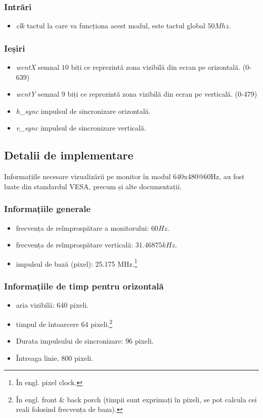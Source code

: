 \documentclass[12pt,twoside,a4paper,fleqn]{book}
\theoremstyle{definition}
\begin{document}
\subsubsection{Intrări}
\begin{itemize}
\item \emph{clk} tactul la care va funcționa acest modul, este tactul global $50Mhz$.
\end{itemize}

\subsubsection{Ieșiri}
\begin{itemize}
\item \emph{wcntX} semnal $10$ biți ce reprezintă zona vizibilă din ecran pe orizontală. (0-639)
\item \emph{wcntY} semnal $9$ biți ce reprezintă zona vizibilă din ecran pe verticală. (0-479)
\item \emph{h\_sync} impulsul de sincronizare orizontală.
\item \emph{v\_sync} impulsul de sincronizare verticală.
\end{itemize}

\subsection{Detalii de implementare}
Informațiile necesare vizualizării pe monitor în modul 640x480@60Hz, au fost luate din standardul VESA, precum și alte documentații.\cite{vga_timings}

\subsubsection{Informațiile generale}
\begin{itemize}
\item frecvența de reîmprospătare a monitorului: $60Hz$.
\item frecvența de reîmprospătare verticală: $31.46875kHz$.
\item impulsul de bază (pixel): 25.175 MHz.\footnote{În engl. pixel clock.}
\end{itemize}

\subsubsection{Informațiile de timp pentru orizontală}
\begin{itemize}
\item aria vizibilă: $640$ pixeli.
\item timpul de întoarcere $64$ pixeli.\footnote{În engl. front \& back porch (timpii sunt exprimați în pixeli, se pot calcula cei reali folosind frecvența de baza).}
\item Durata impulsului de sincronizare: $96$ pixeli.
\item Întreaga linie, $800$ pixeli.
\end{itemize}
\end{document}
